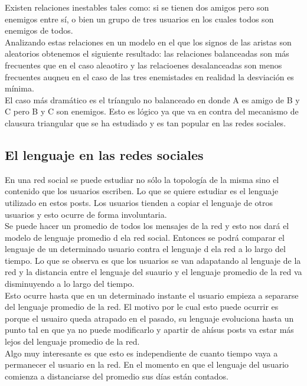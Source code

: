 \documentclass[titlepage,a4paper]{article}
\begin{document}
Existen relaciones inestables tales como: si se tienen dos amigos pero son enemigos entre sí, o bien un grupo de tres usuarios en los cuales todos son enemigos de todos. \\

Analizando estas relaciones en un modelo en el que los signos de las aristas son aleatorios obtenemos el siguiente resultado: las relaciones balanceadas son más frecuentes que en el caso aleaotiro y las relacioenes desalanceadas son menos frecuentes auqneu en el caso de las tres enemistades en realidad la desviación es mínima. \\

El caso más dramático es el tríangulo no balanceado en donde A es amigo de B y C pero B y C son enemigos. Esto es lógico ya que va en contra del mecanismo de clausura triangular que se ha estudiado y es tan popular en las redes sociales. 

\subsection*{El lenguaje en las redes sociales}
En una red social se puede estudiar no sólo la topología de la misma sino el contenido que los usuarios escriben. Lo  que se quiere estudiar es el lenguaje utilizado en estos posts. Los usuarios tienden a copiar el lenguaje de otros usuarios y esto ocurre de forma involuntaria. \\

Se puede hacer un promedio de todos los mensajes de la red y esto nos dará el modelo de lenguaje promedio d ela red social. Entonces se podrá comparar el lenguaje de un determinado usuario contra el lenguaje d ela red a lo largo del tiempo. Lo que se observa es que los usuarios se van adapatando al lenguaje de la red y la distancia entre el lenguaje del suaurio y el lenguaje promedio de la red va disminuyendo a lo largo del tiempo. \\

Esto ocurre hasta que en un determinado instante el usuario empieza a separarse del lenguaje promedio de la red. El motivo por le cual esto puede ocurrir es porque el usuairo queda atrapado en el pasado, su lenguaje evoluciona hasta un punto tal  en que ya no puede modificarlo y apartir de ahísus posts va estar más lejos del lenguaje promedio de la red. \\

Algo muy interesante es que esto es independiente de cuanto tiempo vaya a permanecer el usuario en la red. En el momento en que el lenguaje del usuario comienza a distanciarse del promedio sus días están contados. 
\end{document}

